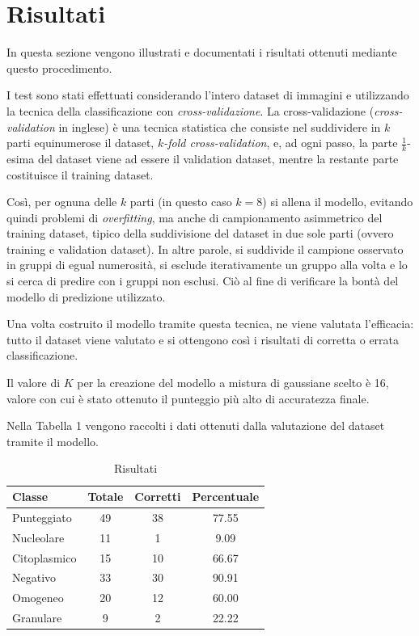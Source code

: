 \section{Risultati}

In questa sezione vengono illustrati e documentati i risultati ottenuti mediante questo procedimento. 

I test sono stati effettuati considerando l'intero dataset di immagini e utilizzando la tecnica della classificazione con \emph{cross-validazione}. La cross-validazione (\emph{cross-validation} in inglese) è una tecnica statistica che consiste nel suddividere in $k$ parti equinumerose il dataset, \emph{$k$-fold cross-validation}, e, ad ogni passo, la parte $\frac{1}{k}$-esima del dataset viene ad essere il validation dataset, mentre la restante parte costituisce il training dataset. 

Così, per ognuna delle $k$ parti (in questo caso $k = 8$) si allena il modello, evitando quindi problemi di \emph{overfitting}, ma anche di campionamento asimmetrico del training dataset, tipico della suddivisione del dataset in due sole parti (ovvero training e validation dataset). In altre parole, si suddivide il campione osservato in gruppi di egual numerosità, si esclude iterativamente un gruppo alla volta e lo si cerca di predire con i gruppi non esclusi. Ciò al fine di verificare la bontà del modello di predizione utilizzato.

Una volta costruito il modello tramite questa tecnica, ne viene valutata l'efficacia: tutto il dataset viene valutato e si ottengono così i risultati di corretta o errata classificazione.

Il valore di $K$ per la creazione del modello a mistura di gaussiane scelto è 16, valore con cui è stato ottenuto il punteggio più alto di accuratezza finale.

Nella Tabella 1 vengono raccolti i dati ottenuti dalla valutazione del dataset tramite il modello.

\begin{table}[H]
\centering
\footnotesize
\begin{tabular}{|l | c | c | c |} 
 \hline 
 \textbf{Classe} &  \textbf{Totale} & \textbf{Corretti} & \textbf{Percentuale} \\ [0.5ex] 
 \hline\hline
 Punteggiato & 49 & 38 & 77.55\\
 Nucleolare & 11 & 1 & 9.09\\
 Citoplasmico & 15 & 10 & 66.67\\
 Negativo & 33 & 30 & 90.91\\
 Omogeneo & 20 & 12 & 60.00\\
 Granulare & 9 & 2 & 22.22\\
 \hline
\end{tabular}
\caption{Risultati}
\label{table:1}
\end{table}


